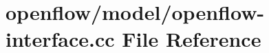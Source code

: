 \hypertarget{openflow-interface_8cc}{}\section{openflow/model/openflow-\/interface.cc File Reference}
\label{openflow-interface_8cc}
